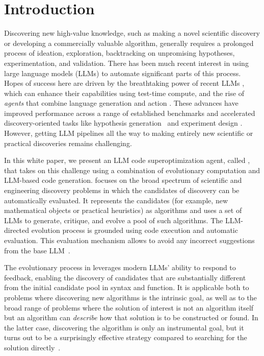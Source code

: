 \section{Introduction}

\label{sec:introduction}

Discovering new high-value knowledge, such as making a novel scientific discovery or developing a commercially valuable algorithm, generally requires a prolonged process of ideation, exploration, backtracking on unpromising hypotheses, experimentation, and validation. There has been much recent interest in using large language models (LLMs) to automate significant parts of this process.
Hopes of success here are driven by the breathtaking power of recent LLMs \cite{gemini25,o3}, which can enhance their capabilities using test-time compute, and the rise of \emph{agents} that combine language generation and action \cite{yao2023react,shinn2023reflexion}. These advances have improved performance across a range of established benchmarks and accelerated discovery-oriented tasks like hypothesis generation~\cite{gottweis2025towards} and experiment design \cite{huang2024crisprgpt,boiko2023autonomous}. However, getting LLM pipelines all the way to making entirely new scientific or practical discoveries remains challenging. 

In this white paper, we present an LLM code superoptimization agent, called \method, that takes on this challenge using a combination of evolutionary computation and LLM-based code generation. \method focuses on the broad spectrum of scientific and engineering discovery problems in which the candidates of discovery can be automatically evaluated. 
It represents the candidates (for example, new mathematical objects or practical heuristics) as algorithms and uses a set of LLMs to generate, critique, and evolve a pool of such algorithms. The LLM-directed evolution process is grounded using code execution and automatic evaluation. 
This evaluation mechanism allows \method to avoid any incorrect suggestions from the base LLM~\citep{huang2025survey}.

The evolutionary process in \method leverages modern LLMs' ability to respond to feedback, enabling the discovery of candidates that are substantially different from the initial candidate pool in syntax and function.
It is applicable both to problems where discovering new algorithms is the intrinsic goal, as well as to the broad range of problems where the solution of interest is not an algorithm itself but an algorithm can \emph{describe} how that solution is to be constructed or found.
In the latter case, discovering the algorithm is only an instrumental goal, but it turns out to be a surprisingly effective strategy compared to searching for the solution directly~\cite{paredes2023mathematical}.

